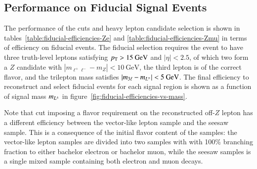 \subsection{Performance on Fiducial Signal Events}\label{sec:fiducial-cutflow}
The performance of the cuts and heavy lepton candidate selection is shown in tables~\ref{table:fiducial-efficiencies-Ze} and \ref{table:fiducial-efficiencies-Zmu} in terms of efficiency on fiducial events. The fiducial selection requires the event to have three truth-level leptons satisfying $p_{\text{T}}>15~\mbox{GeV}$ and $|\eta|<2.5$, of which two form a $Z$ candidate with $|m_{\ell^+ \ell^-}-m_Z|<10~\mbox{GeV}$, the third lepton is of the correct flavor, and the trilepton mass satisfies $|m_{3\ell}-m_{L^{\pm}}|<5~\mbox{GeV}$. The final efficiency to reconstruct and select fiducial events for each signal region is shown as a function of signal mass $m_{L^{\pm}}$ in figure~\ref{fig:fiducial-efficiencies-vs-mass}.

Note that cut imposing a flavor requirement on the reconstructed off-$Z$ lepton has a different efficiency between the vector-like lepton sample and the seesaw sample. This is a consequence of the initial flavor content of the samples: the vector-like lepton samples are divided into two samples with with 100\% branching fraction to either bachelor electron or bachelor muon, while the seesaw samples is a single mixed sample containing both electron and muon decays. 



